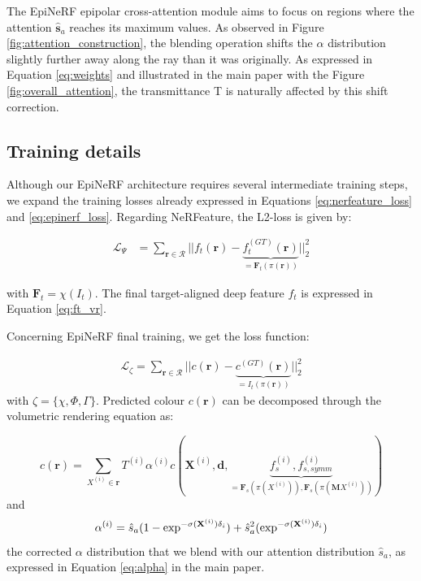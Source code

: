 The EpiNeRF epipolar cross-attention module aims to focus on regions where the attention $\hat{\textbf{s}}_{a}$ reaches its maximum values. As observed in Figure \ref{fig:attention_construction}, the blending operation shifts the $\alpha$ distribution slightly further away along the ray than it was originally. As expressed in Equation \ref{eq:weights} and illustrated in the main paper with the Figure \ref{fig:overall_attention}, the transmittance T is naturally affected by this shift correction. 

\subsection{Training details}
Although our EpiNeRF architecture requires several intermediate training steps, we expand the training losses already expressed in Equations \ref{eq:nerfeature_loss} and \ref{eq:epinerf_loss}. Regarding NeRFeature, the L2-loss is given by: 

\begin{equation}
\begin{split}
 \mathcal{L}_{\Psi}&= \sum_{\mathbf{r}\in\mathcal{R}} || f_{t}(\mathbf{r}) - \underbrace{f_{t}^{(GT)}(\mathbf{r})}_{=\mathbf{F}_{t}(\pi(\mathbf{r}))} ||_{2}^{2} 
\end{split}
\end{equation}

with $\mathbf{F}_{t} = \chi(I_{t})$. The final target-aligned deep feature $f_{t}$ is expressed in Equation \ref{eq:ft_vr}. \newline

Concerning EpiNeRF final training, we get the loss function: 

\begin{equation}
\begin{split}
 \mathcal{L}_{\zeta}= \sum_{\mathbf{r}\in\mathcal{R}} || c(\mathbf{r}) - \underbrace{c^{(GT)}(\mathbf{r})}_{= I_{t}(\pi(\mathbf{r}))} ||_{2}^{2}
\end{split}
\end{equation}
with $\zeta = \{\chi,\Phi,\Gamma\}$. Predicted colour $c(\mathbf{r})$ can be decomposed through the volumetric rendering equation as: 

\begin{equation}
c(\mathbf{r}) = \sum_{X^{(i)} \in \mathbf{r}}T^{(i)}\alpha^{(i)}c(\mathbf{X}^{(i)},\mathbf{d},\underbrace{f_{s}^{(i)},f_{s,symm}^{(i)}}_{= \mathbf{F}_{s}(\pi(X^{(i)})), \mathbf{F}_{s}(\pi(\mathbf{M}X^{(i)}))})
\end{equation}
and
\begin{equation}
\alpha^{(i)} = \hat{s}_{a}(1-\exp^{-\sigma(\mathbf{X}^{(i)})\delta_{i}}) + \hat{s}_{a}^{2}(\exp^{-\sigma(\mathbf{X}^{(i)})\delta_{i}}) \\
\end{equation}
the corrected $\alpha$ distribution that we blend with our attention distribution $\hat{s}_{a}$, as expressed in Equation \ref{eq:alpha} in the main paper. 

